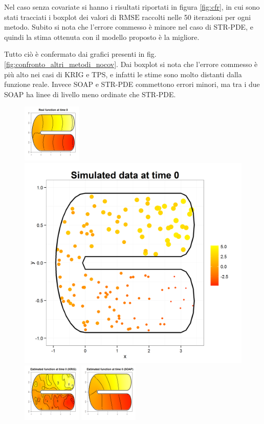 \documentclass[a4paper,11pt,twoside,openright]{book}							%
\begin{document}
Nel caso senza covariate si hanno i risultati riportati in figura \ref{fig:cfr}, in cui sono stati tracciati i boxplot dei valori di $\mathrm{RMSE}$ raccolti nelle 50 iterazioni per ogni metodo. Subito si nota che l'errore commesso è minore nel caso di STR-PDE, e quindi la stima ottenuta con il modello proposto è la migliore.

Tutto ciò è confermato dai grafici presenti in fig. \ref{fig:confronto_altri_metodi_nocov}. Dai boxplot si nota che l'errore commesso è più alto nei casi di KRIG e TPS, e infatti le stime sono molto distanti dalla funzione reale. Invece SOAP e STR-PDE commettono errori minori, ma tra i due SOAP ha linee di livello meno ordinate che STR-PDE. 

\begin{landscape}
\begin{figure}
\centering
\includegraphics[width=0.25\textwidth]{immagini/simulazioni/REALEtempo1.png}
\includegraphics[height=0.25\textwidth]{immagini/simulazioni/Dati_tempo1.png}
\includegraphics[width=0.25\textwidth]{immagini/simulazioni/KRIGtempo1.png}
\includegraphics[width=0.25\textwidth]{immagini/simulazioni/SOAPtempo1.png}

\end{figure}
\end{landscape}
\end{document}
